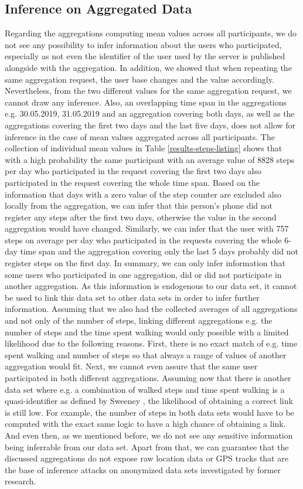 \subsection{Inference on Aggregated Data}\label{inference}
Regarding the aggregations computing mean values across all participants, we do not see any possibility to infer information about the users who participated, especially as not even the identifier of the user used by the server is published alongside with the aggregation. In addition, we showed that when repeating the same aggregation request, the user base changes and the value accordingly. Nevertheless, from the two different values for the same aggregation request, we cannot draw any inference. Also, an overlapping time span in the aggregations e.g. 30.05.2019, 31.05.2019 and an aggregation covering both days, as well as the aggregations covering the first two days and the last five days, does not allow for inference in the case of mean values aggregated across all participants.
The collection of individual mean values in Table \ref{results-steps-listing} shows that with a high probability the same participant with an average value of 8828 steps per day who participated in the request covering the first two days also participated in the request covering the whole time span. Based on the information that days with a zero value of the step counter are excluded also locally from the aggregation, we can infer that this person's phone did not register any steps after the first two days, otherwise the value in the second aggregation would have changed. Similarly, we can infer that the user with 757 steps on average per day who participated in the requests covering the whole 6-day time span and the aggregation covering only the last 5 days probably did not register steps on the first day.
In summary, we can only infer information that some users who participated in one aggregation, did or did not participate in another aggregation. As this information is endogenous to our data set, it cannot be used to link this data set to other data sets in order to infer further information.
Assuming that we also had the collected averages of all aggregations and not only of the number of steps, linking different aggregations e.g. the number of steps and the time spent walking would only possible with a limited likelihood due to the following reasons. First, there is no exact match of e.g. time spent walking and number of steps so that always a range of values of another aggregation would fit. Next, we cannot even assure that the same user participated in both different aggregations. Assuming now that there is another data set where e.g. a combination of walked steps and time spent walking is a quasi-identifier as defined by Sweeney \parencite{k-anonymity-achieving}, the likelihood of obtaining a correct link is still low. For example, the number of steps in both data sets would have to be computed with the exact same logic to have a high chance of obtaining a link. And even then, as we mentioned before, we do not see any sensitive information being inferrable from our data set. Apart from that, we can guarantee that the discussed aggregations do not expose raw location data or GPS tracks that are the base of inference attacks on anonymized data sets investigated by former research.

